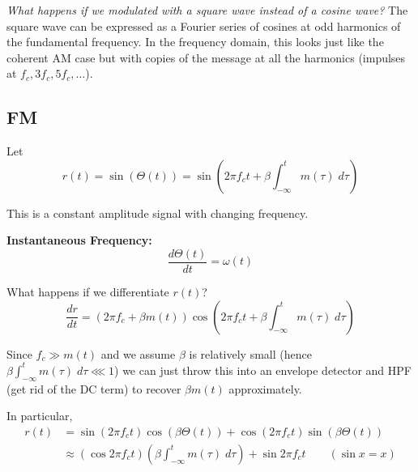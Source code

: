 \documentclass[12pt]{report}
\newcommand*{\tbf}[1]{\ifmmode\mathbf{#1}\else\textbf{#1}\fi}
\begin{document}
\emph{What happens if we modulated with a square wave instead of a cosine wave?} The square wave can be expressed as a Fourier series of cosines at odd harmonics of the fundamental frequency. In the frequency domain, this looks just like the coherent AM case but with copies of the message at all the harmonics (impulses at $f_c, 3f_c, 5f_c, \ldots$).

\subsection{FM} 

Let 
\[r(t) = \sin (\Theta(t)) = \sin\left(2\pi f_c t + \beta\int_{-\infty}^t m(\tau) \; d\tau\right)\]

This is a constant amplitude signal with changing frequency. 

\tbf{Instantaneous Frequency:}
\[\frac{d\Theta(t)}{dt} = \omega(t) \]

What happens if we differentiate $r(t)$?
\[    \frac{dr}{dt} = (2\pi f_c + \beta m(t)) \cos\left(2\pi f_c t + \beta\int_{-\infty}^t m(\tau)\; d\tau\right) 
\] 

Since $f_c \gg m(t)$ and we assume $\beta$ is relatively small (hence $\beta \int_{-\infty}^t m(\tau)\; d\tau \lll 1$) we can just throw this into an envelope detector and HPF (get rid of the DC term) to recover $\beta m(t)$ approximately.

\begin{center}
\end{center}

In particular, 
\begin{align*}
    r(t) &= \sin (2\pi f_c t) \cos (\beta \Theta(t)) + \cos (2\pi f_c t) \sin (\beta \Theta(t))\\ 
    &\approx (\cos 2\pi f_c t) \left(\beta \int_{-\infty}^t m(\tau)\; d\tau\right) + \sin 2\pi f_c t \qquad (\sin x = x)
\end{align*}
\end{document}
